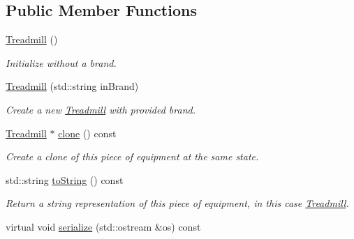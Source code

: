 \subsection*{Public Member Functions}
\begin{DoxyCompactItemize}
\item 
\hypertarget{class_treadmill_a6c98a2dc36727f6ccef997a01be27acd}{}\hyperlink{class_treadmill_a6c98a2dc36727f6ccef997a01be27acd}{Treadmill} ()\label{class_treadmill_a6c98a2dc36727f6ccef997a01be27acd}

\begin{DoxyCompactList}\small\item\em Initialize without a brand. \end{DoxyCompactList}\item 
\hyperlink{class_treadmill_a7ec4387dbd384f43b334489d0b11c375}{Treadmill} (std\+::string in\+Brand)
\begin{DoxyCompactList}\small\item\em Create a new \hyperlink{class_treadmill}{Treadmill} with provided brand. \end{DoxyCompactList}\item 
\hypertarget{class_treadmill_a08f97c25ccacfe75006d15d588ab1a7e}{}\hyperlink{class_treadmill}{Treadmill} $\ast$ \hyperlink{class_treadmill_a08f97c25ccacfe75006d15d588ab1a7e}{clone} () const \label{class_treadmill_a08f97c25ccacfe75006d15d588ab1a7e}

\begin{DoxyCompactList}\small\item\em Create a clone of this piece of equipment at the same state. \end{DoxyCompactList}\item 
\hypertarget{class_treadmill_a3e3bd72be9733d69bb24a403bc8e0adb}{}std\+::string \hyperlink{class_treadmill_a3e3bd72be9733d69bb24a403bc8e0adb}{to\+String} () const \label{class_treadmill_a3e3bd72be9733d69bb24a403bc8e0adb}

\begin{DoxyCompactList}\small\item\em Return a string representation of this piece of equipment, in this case \textquotesingle{}\hyperlink{class_treadmill}{Treadmill}\textquotesingle{}. \end{DoxyCompactList}\item 
\hypertarget{class_treadmill_a81bf5856fe15db5adf3ebf988a815b11}{}virtual void \hyperlink{class_treadmill_a81bf5856fe15db5adf3ebf988a815b11}{serialize} (std\+::ostream \&os) const \label{class_treadmill_a81bf5856fe15db5adf3ebf988a815b11}


\end{DoxyCompactItemize}
